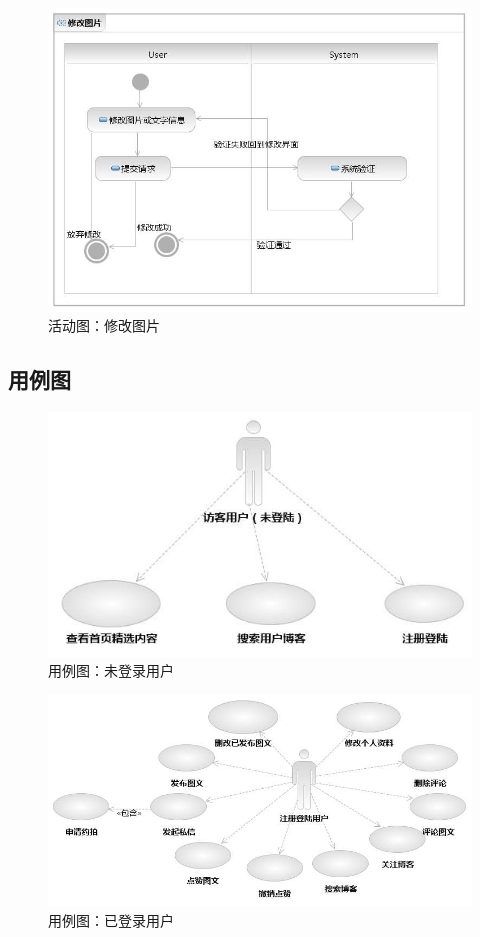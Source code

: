 \documentclass[a4paper,14pt]{ctexart}
\begin{document}
\begin{figure}[H]
\centering\includegraphics[width=4.5in]{活动图-修改图片.jpeg}
\caption{活动图：修改图片}
\end{figure}

\subsection{用例图}
\begin{figure}[H]
\centering\includegraphics[width=4.5in]{用例图-访客.jpeg}
\caption{用例图：未登录用户}
\end{figure}

\begin{figure}[H]
\centering\includegraphics[width=4.5in]{用例图-用户.jpeg}
\caption{用例图：已登录用户}
\end{figure}
\end{document}
